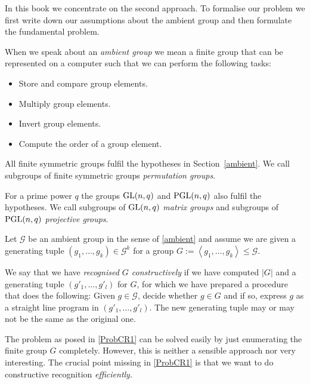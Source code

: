 In this book we concentrate on the second approach. To formalise our
problem we first write down our assumptions about the ambient group
and then formulate the fundamental problem.

\begin{Hyp}
\label{ambient}
When we speak about an \emph{ambient group} we mean a finite group that can
be represented on a computer such that we can perform the following tasks:
\begin{itemize}
\item Store and compare group elements.
\item Multiply group elements.
\item Invert group elements.
\item Compute the order of a group element.
\end{itemize}
\end{Hyp}

\begin{Rem}
All finite symmetric groups fulfil the hypotheses in Section~\ref{ambient}.
We call subgroups of finite symmetric groups \emph{permutation groups}.

For a prime power $q$ the groups $\GL(n,q)$ and $\PGL(n,q)$ also fulfil
the hypotheses. We call subgroups of $\GL(n,q)$ \emph{matrix groups}
and subgroups of $\PGL(n,q)$ \emph{projective groups}.
\end{Rem}

\begin{Problem}
\label{ProbCR1}
Let $\mathcal{G}$ be an ambient group in the sense of \ref{ambient} and 
assume we are given a generating tuple $(g_1, \ldots, g_k) \in
\mathcal{G}^k$ for a group
$G := \left< g_1, \ldots, g_k \right> \le \mathcal{G}$. 

We say that we have \emph{recognised $G$ constructively} if we have 
computed $|G|$ and a
generating tuple $( g'_1, \ldots, g'_l )$ for $G$, for which we have
prepared a procedure that does the following: Given $g \in \mathcal{G}$,
decide whether $g \in G$ and if so, express $g$ as a straight line program
in $(g'_1, \ldots, g'_l)$. The new generating tuple may or may not be the
same as the original one.
\end{Problem}

\begin{Rem}
The problem as posed in \ref{ProbCR1} can be solved easily by just
enumerating the finite group $G$ completely. However, this is neither
a sensible approach nor very interesting. The crucial point missing
in \ref{ProbCR1} is that we want to do constructive recognition
\emph{efficiently}. 
\end{Rem}

